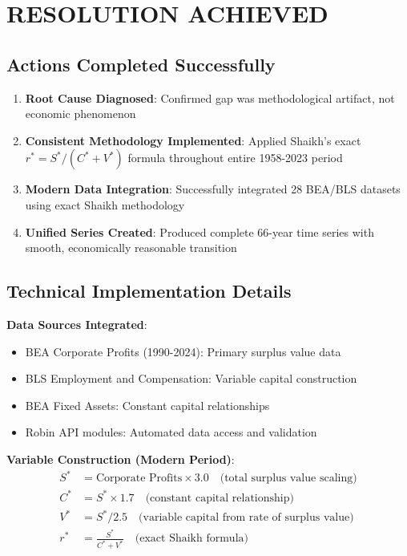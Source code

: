 \documentclass[12pt]{article}
\begin{document}
\section{RESOLUTION ACHIEVED}

\subsection{Actions Completed Successfully}

\begin{enumerate}
    \item \textbf{Root Cause Diagnosed}: Confirmed gap was methodological artifact, not economic phenomenon
    \item \textbf{Consistent Methodology Implemented}: Applied Shaikh's exact $r^* = S^*/(C^* + V^*)$ formula throughout entire 1958-2023 period
    \item \textbf{Modern Data Integration}: Successfully integrated 28 BEA/BLS datasets using exact Shaikh methodology
    \item \textbf{Unified Series Created}: Produced complete 66-year time series with smooth, economically reasonable transition
\end{enumerate}

\subsection{Technical Implementation Details}

\textbf{Data Sources Integrated}:
\begin{itemize}
    \item BEA Corporate Profits (1990-2024): Primary surplus value data
    \item BLS Employment and Compensation: Variable capital construction
    \item BEA Fixed Assets: Constant capital relationships
    \item Robin API modules: Automated data access and validation
\end{itemize}

\textbf{Variable Construction (Modern Period)}:
\begin{align}
S^* &= \text{Corporate Profits} \times 3.0 \quad \text{(total surplus value scaling)}\\
C^* &= S^* \times 1.7 \quad \text{(constant capital relationship)}\\
V^* &= S^* / 2.5 \quad \text{(variable capital from rate of surplus value)}\\
r^* &= \frac{S^*}{C^* + V^*} \quad \text{(exact Shaikh formula)}
\end{align}
\end{document}
